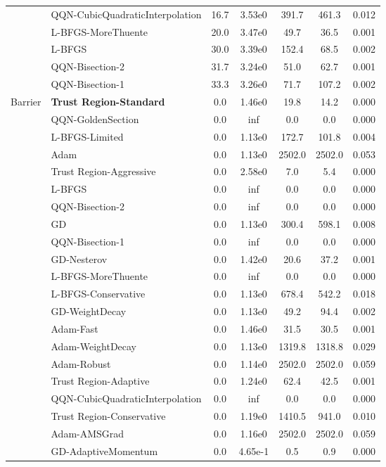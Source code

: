 \documentclass{article}
\begin{document}
\begin{table}[htbp]
{\begin{tabular}{p{2.5cm}p{2.5cm}*{5}{c}}
 & QQN-CubicQuadraticInterpolation & 16.7 & 3.53e0 & 391.7 & 461.3 & 0.012 \\
 & L-BFGS-MoreThuente & 20.0 & 3.47e0 & 49.7 & 36.5 & 0.001 \\
 & L-BFGS & 30.0 & 3.39e0 & 152.4 & 68.5 & 0.002 \\
 & QQN-Bisection-2 & 31.7 & 3.24e0 & 51.0 & 62.7 & 0.001 \\
 & QQN-Bisection-1 & 33.3 & 3.26e0 & 71.7 & 107.2 & 0.002 \\
\midrule
\multirow{25}{*}{Barrier} & \textbf{Trust Region-Standard} & 0.0 & 1.46e0 & 19.8 & 14.2 & 0.000 \\
 & QQN-GoldenSection & 0.0 & inf & 0.0 & 0.0 & 0.000 \\
 & L-BFGS-Limited & 0.0 & 1.13e0 & 172.7 & 101.8 & 0.004 \\
 & Adam & 0.0 & 1.13e0 & 2502.0 & 2502.0 & 0.053 \\
 & Trust Region-Aggressive & 0.0 & 2.58e0 & 7.0 & 5.4 & 0.000 \\
 & L-BFGS & 0.0 & inf & 0.0 & 0.0 & 0.000 \\
 & QQN-Bisection-2 & 0.0 & inf & 0.0 & 0.0 & 0.000 \\
 & GD & 0.0 & 1.13e0 & 300.4 & 598.1 & 0.008 \\
 & QQN-Bisection-1 & 0.0 & inf & 0.0 & 0.0 & 0.000 \\
 & GD-Nesterov & 0.0 & 1.42e0 & 20.6 & 37.2 & 0.001 \\
 & L-BFGS-MoreThuente & 0.0 & inf & 0.0 & 0.0 & 0.000 \\
 & L-BFGS-Conservative & 0.0 & 1.13e0 & 678.4 & 542.2 & 0.018 \\
 & GD-WeightDecay & 0.0 & 1.13e0 & 49.2 & 94.4 & 0.002 \\
 & Adam-Fast & 0.0 & 1.46e0 & 31.5 & 30.5 & 0.001 \\
 & Adam-WeightDecay & 0.0 & 1.13e0 & 1319.8 & 1318.8 & 0.029 \\
 & Adam-Robust & 0.0 & 1.14e0 & 2502.0 & 2502.0 & 0.059 \\
 & Trust Region-Adaptive & 0.0 & 1.24e0 & 62.4 & 42.5 & 0.001 \\
 & QQN-CubicQuadraticInterpolation & 0.0 & inf & 0.0 & 0.0 & 0.000 \\
 & Trust Region-Conservative & 0.0 & 1.19e0 & 1410.5 & 941.0 & 0.010 \\
 & Adam-AMSGrad & 0.0 & 1.16e0 & 2502.0 & 2502.0 & 0.059 \\
 & GD-AdaptiveMomentum & 0.0 & 4.65e-1 & 0.5 & 0.9 & 0.000 \\

\end{tabular}}
\end{table}
\end{document}
